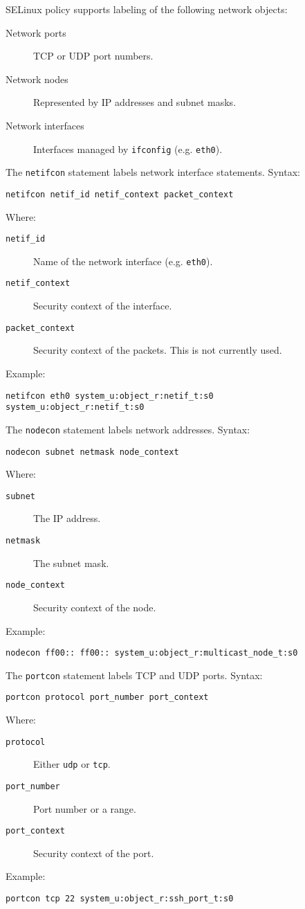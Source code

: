 SELinux policy supports labeling of the following network objects:
\begin{description}
    \item [Network ports] TCP or UDP port numbers.
    \item [Network nodes] Represented by IP addresses and subnet masks.
    \item [Network interfaces] Interfaces managed by \texttt{ifconfig} (e.g.
        \texttt{eth0}).
\end{description}

The \texttt{netifcon} statement labels network interface statements. Syntax:
\begin{lstlisting}
netifcon netif_id netif_context packet_context
\end{lstlisting}
Where:
\begin{description}
    \item [\texttt{netif\_id}] Name of the network interface (e.g.
        \texttt{eth0}).
    \item [\texttt{netif\_context}] Security context of the interface.
    \item [\texttt{packet\_context}] Security context of the packets. This is
        not currently used.
\end{description}
Example:
\begin{lstlisting}
netifcon eth0 system_u:object_r:netif_t:s0 system_u:object_r:netif_t:s0
\end{lstlisting}

The \texttt{nodecon} statement labels network addresses. Syntax:
\begin{lstlisting}
nodecon subnet netmask node_context
\end{lstlisting}
Where:
\begin{description}
    \item [\texttt{subnet}] The IP address.
    \item [\texttt{netmask}] The subnet mask.
    \item [\texttt{node\_context}] Security context of the node.
\end{description}
Example:
\begin{lstlisting}
nodecon ff00:: ff00:: system_u:object_r:multicast_node_t:s0
\end{lstlisting}

The \texttt{portcon} statement labels TCP and UDP ports. Syntax:
\begin{lstlisting}
portcon protocol port_number port_context
\end{lstlisting}
Where:
\begin{description}
    \item [\texttt{protocol}] Either \texttt{udp} or \texttt{tcp}.
    \item [\texttt{port\_number}] Port number or a range.
    \item [\texttt{port\_context}] Security context of the port.
\end{description}
Example:
\begin{lstlisting}
portcon tcp 22 system_u:object_r:ssh_port_t:s0
\end{lstlisting}

